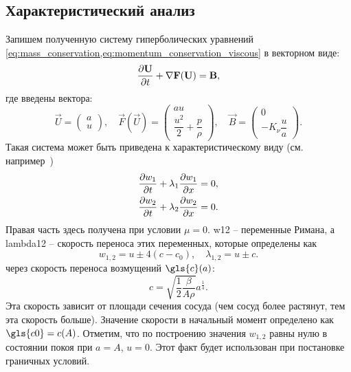 \subsection{Характеристический анализ}
Запишем полученную систему гиперболических уравнений \cref{eq:mass_conservation,eq:momentum_conservation_viscous}
в векторном виде:
\begin{equation}
\label{eq:vector_system}
\frac{\partial \boldsymbol{\rm U}}{\partial t} + \nabla \boldsymbol{\rm F}(\boldsymbol{\rm U}) = \boldsymbol{\rm B},
\end{equation}
где введены вектора:
\begin{equation}
\nonumber
\vec U =
\left(\begin{array}{c}
a \\
u
\end{array}\right),
\quad
\vec F(\vec U) =
\left(\begin{array}{c}
au\\
\dfrac{u^2}{2} + \dfrac{p}{\rho}
\end{array}\right),
\quad
\vec B =
\left(\begin{array}{c}
0\\
-K_{\nu} \dfrac{u}{a}
\end{array}\right).
\end{equation}
Такая система может быть приведена к характеристическому виду (см. например~\cite{Sherwin2003})
\begin{equation}
\label{eq:w12_system}
\begin{aligned}
&\frac{\partial w_1}{\partial t} + \lambda_1 \frac{\partial w_1}{\partial x} = 0, \\
&\frac{\partial w_2}{\partial t} + \lambda_2 \frac{\partial w_2}{\partial x} = 0.
\end{aligned}
\end{equation}
Правая часть здесь получена при условии $\mu=0$.
\gls{w12} -- переменные Римана, а \gls{lambda12} -- скорость переноса этих переменных, которые определены как
\begin{equation}
\label{eq:w12_def}
w_{1,2} = u \pm 4(c - c_0), \quad \lambda_{1,2} = u \pm c.
\end{equation}
через скорость переноса возмущений $\gls{c}(a)$:
\begin{equation}
\label{eq:c_from_a}
c = \sqrt{\frac12\frac{\beta}{A\rho}}a^{\frac{1}{4}}.
\end{equation}
Эта скорость зависит от площади сечения сосуда (чем сосуд более растянут, тем эта скорость больше).
Значение скорости в начальный момент определено как $\gls{c0} = c(A)$.
Отметим, что по построению значения $w_{1,2}$ равны нулю в состоянии покоя при $a=A$, $u=0$.
Этот факт будет использован при постановке граничных условий.

